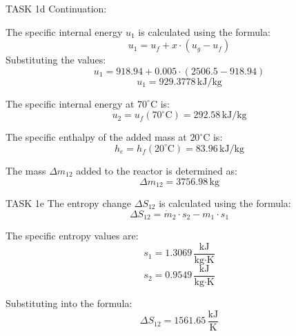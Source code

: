 TASK 1d  
Continuation:  

The specific internal energy \( u_1 \) is calculated using the formula:  
\[
u_1 = u_f + x \cdot (u_g - u_f)
\]  
Substituting the values:  
\[
u_1 = 918.94 + 0.005 \cdot (2506.5 - 918.94)
\]  
\[
u_1 = 929.3778 \, \text{kJ/kg}
\]  

The specific internal energy at \( 70^\circ\text{C} \) is:  
\[
u_2 = u_f(70^\circ\text{C}) = 292.58 \, \text{kJ/kg}
\]  

The specific enthalpy of the added mass at \( 20^\circ\text{C} \) is:  
\[
h_e = h_f(20^\circ\text{C}) = 83.96 \, \text{kJ/kg}
\]  

The mass \( \Delta m_{12} \) added to the reactor is determined as:  
\[
\Delta m_{12} = 3756.98 \, \text{kg}
\]  

TASK 1e  
The entropy change \( \Delta S_{12} \) is calculated using the formula:  
\[
\Delta S_{12} = \dot{m}_2 \cdot s_2 - m_1 \cdot s_1
\]  

The specific entropy values are:  
\[
s_1 = 1.3069 \, \frac{\text{kJ}}{\text{kg·K}}
\]  
\[
s_2 = 0.9549 \, \frac{\text{kJ}}{\text{kg·K}}
\]  

Substituting into the formula:  
\[
\Delta S_{12} = 1561.65 \, \frac{\text{kJ}}{\text{K}}
\]  